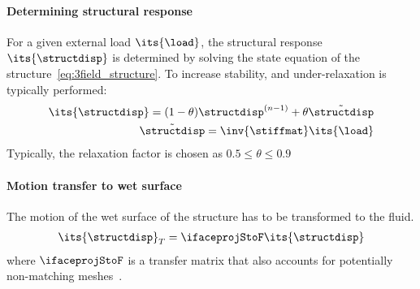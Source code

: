 \documentclass[../main.tex]{subfiles}
\begin{document}
\paragraph{\raisebox{.5pt}{\textcircled{\raisebox{-.9pt} {1}}} Determining structural response}
For a given external load $\its{\load}$, the structural response $\its{\structdisp}$ is determined by solving the state equation of the structure~\eqref{eq:3field_structure}. To increase stability, and under-relaxation is typically performed:
\begin{align}
\its{\structdisp}=(1-\theta)\structdisp^{(n-1)}+\theta \tilde{\structdisp} \\
\tilde{\structdisp} = \inv{\stiffmat} \its{\load}
\end{align}
Typically, the relaxation factor is chosen as $0.5\leq\theta\leq 0.9$

\paragraph{\raisebox{.5pt}{\textcircled{\raisebox{-.9pt} {2}}} Motion transfer to wet surface}
The motion of the wet surface of the structure has to be transformed to the fluid.
\begin{align}
\its{\structdisp}_T = \ifaceprojStoF \its{\structdisp}
\end{align}
where $\ifaceprojStoF$ is a transfer matrix that also accounts for potentially non-matching meshes~\cite{Maute2001}.
\end{document}
